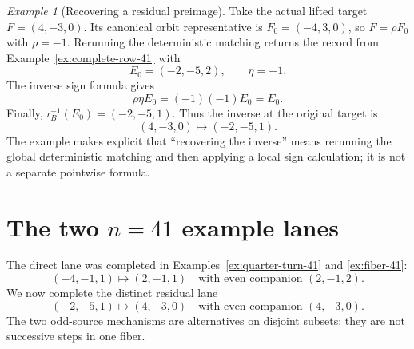 \documentclass[11pt]{amsart}
\theoremstyle{definition}
\theoremstyle{remark}
\newtheorem{example}[theorem]{Example}
\begin{document}
\begin{example}[Recovering a residual preimage]
\label{ex:inverse-41}
Take the actual lifted target $F=(4,-3,0)$.  Its canonical orbit
representative is $F_0=(-4,3,0)$, so $F=\rho F_0$ with $\rho=-1$.
Rerunning the deterministic matching returns the record from
Example~\ref{ex:complete-row-41} with
\[
 E_0=(-2,-5,2),
 \qquad
 \eta=-1.
\]
The inverse sign formula gives
\[
 \rho\eta E_0=(-1)(-1)E_0=E_0.
\]
Finally, $\iota_B^{-1}(E_0)=(-2,-5,1)$.  Thus the inverse at the original
target is
\[
 (4,-3,0)\longmapsto(-2,-5,1).
\]
The example makes explicit that ``recovering the inverse'' means rerunning the
global deterministic matching and then applying a local sign calculation; it
is not a separate pointwise formula.
\end{example}

\section{The two \texorpdfstring{$n=41$}{n=41} example lanes}
\label{sec:example}

The direct lane was completed in Examples~\ref{ex:quarter-turn-41} and
\ref{ex:fiber-41}:
\[
 (-4,-1,1)\longmapsto(2,-1,1)
 \quad\text{with even companion }(2,-1,2).
\]
We now complete the distinct residual lane
\[
 (-2,-5,1)\longmapsto(4,-3,0)
 \quad\text{with even companion }(4,-3,0).
\]
The two odd-source mechanisms are alternatives on disjoint subsets; they are
not successive steps in one fiber.
\end{document}
